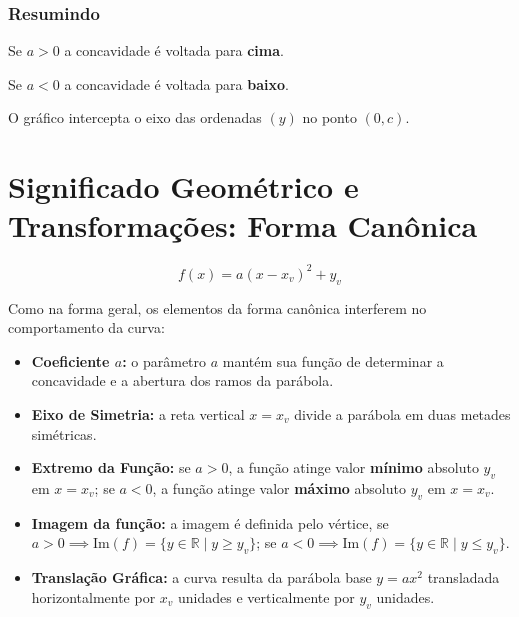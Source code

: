 \documentclass[12pt,a4paper]{report}
\begin{document}
\vspace{0.4cm}

\subsubsection*{Resumindo}

\begin{destaque}[Concavidade]
	\label{dest:concavidade}
	Se $a>0$ a concavidade é voltada para \textbf{cima}.
	
	Se $a<0$ a concavidade é voltada para \textbf{baixo}.
\end{destaque}

\begin{destaque}
	\label{dest:eixo_y}
	O gráfico intercepta o eixo das ordenadas $(y)$ no ponto $(0, c)$.
\end{destaque}



	\section{Significado Geométrico e Transformações: Forma Canônica}
	\label{subsec:geo_canonica}
	
	$$f(x) = a(x - x_v)^2 + y_v$$
	
	Como na forma geral, os elementos da forma canônica interferem no comportamento da curva:
\begin{itemize}
	\item \textbf{Coeficiente $a$:} o parâmetro $a$ mantém sua função de determinar a concavidade e a abertura dos ramos da parábola.
	\item \textbf{Eixo de Simetria:} a reta vertical $x = x_v$ divide a parábola em duas metades simétricas.
	\item \textbf{Extremo da Função:} 
	se $a > 0$, a função atinge valor \textbf{mínimo} absoluto $y_v$ em $x = x_v$; 
	se $a < 0$, a função atinge valor \textbf{máximo} absoluto $y_v$ em $x = x_v$.
	\item \textbf{Imagem da função:} a imagem é definida pelo vértice, se \\$a > 0 \implies \text{Im}(f)=\{y \in \mathbb{R} \mid y \geqslant y_v \}$; se $a<0 \implies \text{Im}(f)=\{y \in \mathbb{R} \mid y \leqslant y_v \}$.
	\item \textbf{Translação Gráfica:} a curva resulta da parábola base $y = ax^2$ transladada horizontalmente por $x_v$ unidades e verticalmente por $y_v$ unidades.
\end{itemize}
\end{document}
